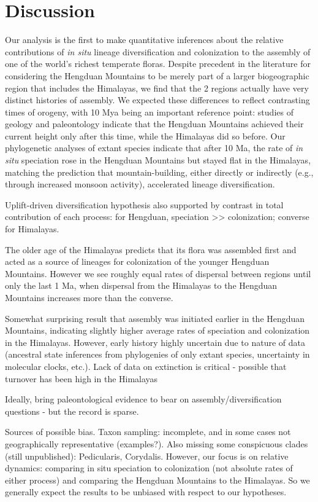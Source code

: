 \section{Discussion}

Our analysis is the first to make quantitative inferences about the relative contributions of \textit{in situ} lineage diversification and colonization to the assembly of one of the world's richest temperate floras. Despite precedent in the literature for considering the Hengduan Mountains to be merely part of a larger biogeographic region that includes the Himalayas, we find that the 2 regions actually have very distinct histories of assembly. We expected these differences to reflect contrasting times of orogeny, with 10 Mya being an important reference point: studies of geology and paleontology indicate that the Hengduan Mountains achieved their current height only after this time, while the Himalayas did so before. Our phylogenetic analyses of extant species indicate that after 10 Ma, the rate of \textit{in situ} speciation rose in the Hengduan Mountains but stayed flat in the Himalayas, matching the prediction that mountain-building, either directly or indirectly (e.g., through increased monsoon activity), accelerated lineage diversification.

Uplift-driven diversification hypothesis also supported by contrast in total contribution of each process: for Hengduan, speciation >> colonization; converse for Himalayas.

The older age of the Himalayas predicts that its flora was assembled first and acted as a source of lineages for colonization of the younger Hengduan Mountains. However we see roughly equal rates of dispersal between regions until only the last 1 Ma, when dispersal from the Himalayas to the Hengduan Mountains increases more than the converse. 

Somewhat surprising result that assembly was initiated earlier in the Hengduan Mountains, indicating slightly higher average rates of speciation and colonization in the Himalayas. However, early history highly uncertain due to nature of data (ancestral state inferences from phylogenies of only extant species, uncertainty in molecular clocks, etc.). Lack of data on extinction is critical - possible that turnover has been high in the Himalayas

Ideally, bring paleontological evidence to bear on assembly/diversification questions - but the record is sparse.

Sources of possible bias. Taxon sampling: incomplete, and in some cases not geographically representative (examples?). Also missing some conspicuous clades (still unpublished): Pedicularis, Corydalis. However, our focus is on relative dynamics: comparing in situ speciation to colonization (not absolute rates of either process) and comparing the Hengduan Mountains to the Himalayas. So we generally expect the results to be unbiased with respect to our hypotheses.
